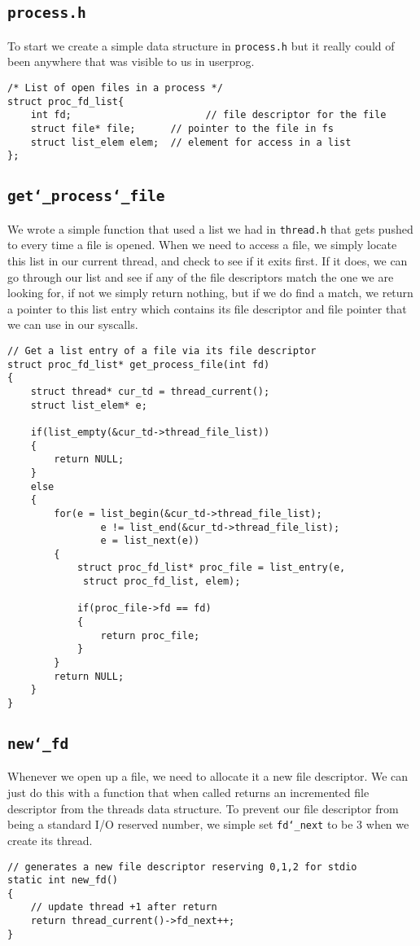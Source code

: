 \documentclass[]{article}
\begin{document}
\subsection{\texttt{process.h}}
To start we create a simple data structure in \texttt{process.h} but it really could of been anywhere that was visible to us in userprog.

  \lstset{language=C, tabsize=2}  
 \begin{lstlisting} 
/* List of open files in a process */
struct proc_fd_list{
	int fd; 			 		  // file descriptor for the file
	struct file* file;		// pointer to the file in fs
	struct list_elem elem;  // element for access in a list
};
\end{lstlisting}
\newpage
\subsection{\texttt{get\char`_process\char`_file}}
We wrote a simple function that used a list we had in \texttt{thread.h} that gets pushed to every time a file is opened. When we need to access a file, we simply locate this list in our current thread, and check to see if it exits first. If it does, we can go through our list and see if any of the file descriptors match the one we are looking for, if not we simply return nothing, but if we do find a match, we return a pointer to this list entry which contains its file descriptor and file pointer that we can use in our syscalls.

  \lstset{language=C, tabsize=2}  
 \begin{lstlisting} 
// Get a list entry of a file via its file descriptor
struct proc_fd_list* get_process_file(int fd)
{
	struct thread* cur_td = thread_current();
	struct list_elem* e;

	if(list_empty(&cur_td->thread_file_list))
	{
		return NULL;
	}
	else
	{
		for(e = list_begin(&cur_td->thread_file_list); 
				e != list_end(&cur_td->thread_file_list);
				e = list_next(e))
		{
			struct proc_fd_list* proc_file = list_entry(e,
			 struct proc_fd_list, elem);

			if(proc_file->fd == fd)
			{
				return proc_file;
			}
		}
		return NULL;
	}
}
\end{lstlisting}
\newpage
\subsection{\texttt{new\char`_fd}}
Whenever we open up a file, we need to allocate it a new file descriptor. We can just do this with a function that when called returns an incremented file descriptor from the threads data structure. To prevent our file descriptor from being a standard I/O reserved number, we simple set \texttt{fd\char`_next} to be 3 when we create its thread.

  \lstset{language=C, tabsize=2}  
 \begin{lstlisting} 
// generates a new file descriptor reserving 0,1,2 for stdio
static int new_fd()
{
	// update thread +1 after return
	return thread_current()->fd_next++;
}

\end{lstlisting}

  \newpage
\end{document}
